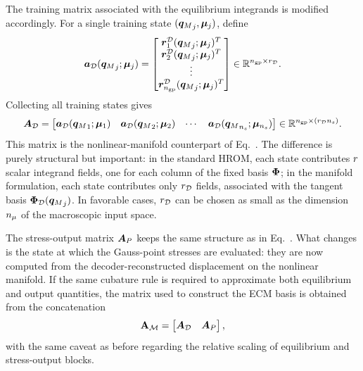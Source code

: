 \documentclass[11pt,a4paper]{article}
\begin{document}
The training matrix associated with the equilibrium integrands is modified
accordingly. For a single training state $({\bm{q}_M}_j,\bm{\mu}_j)$, define
\begin{equation}
\label{eq:aforceD_single_state}
\bm{a}_{\mathcal{D}}({\bm{q}_M}_j;\bm{\mu}_j)
=
\begin{bmatrix}
\bm{r}^{\mathcal{D}}_{1}({\bm{q}_M}_j;\bm{\mu}_j)^T\\
\bm{r}^{\mathcal{D}}_{2}({\bm{q}_M}_j;\bm{\mu}_j)^T\\
\vdots\\
\bm{r}^{\mathcal{D}}_{n_{\mathrm{gp}}}({\bm{q}_M}_j;\bm{\mu}_j)^T
\end{bmatrix}
\in \mathbb{R}^{n_{\mathrm{gp}}\times r_{\mathcal{D}}}.
\end{equation}
Collecting all training states gives
\begin{equation}
\label{eq:AforceD_training_matrix}
    \bm{A}_{\mathcal{D}}
    =
    \begin{bmatrix}
        \bm{a}_{\mathcal{D}}({\bm{q}_M}_1;\bm{\mu}_1) &
        \bm{a}_{\mathcal{D}}({\bm{q}_M}_2;\bm{\mu}_2) &
        \cdots &
        \bm{a}_{\mathcal{D}}({\bm{q}_M}_{n_s};\bm{\mu}_{n_s})
    \end{bmatrix}
    \in \mathbb{R}^{n_{\mathrm{gp}}\times(r_{\mathcal{D}}n_s)}.
\end{equation}
This matrix is the nonlinear-manifold counterpart of
Eq.~. The difference is purely structural but important:
in the standard HROM, each state contributes $r$ scalar integrand fields,
one for each column of the fixed basis $\bm{\Phi}$; in the manifold formulation,
each state contributes only $r_{\mathcal{D}}$ fields, associated with the tangent basis
$\bm{\Phi}_{\mathcal{D}}({\bm{q}_M}_j)$. In favorable cases, $r_{\mathcal{D}}$ can be chosen as small as the
dimension $n_{\mu}$ of the macroscopic input space.

The stress-output matrix $\bm{A}_{P}$ keeps the same structure as in
Eq.~. What changes is the state at which the
Gauss-point stresses are evaluated: they are now computed from the
decoder-reconstructed displacement on the nonlinear manifold. If the same
cubature rule is required to approximate both equilibrium and output
quantities, the matrix used to construct the ECM basis is obtained from the
concatenation
\begin{equation}
\label{eq:manifold_fixed_ECM_training_matrix}
  \mathbf{A}_{\mathcal{M}} =   \begin{bmatrix}
    \bm{A}_{\mathcal{D}} & \bm{A}_{P}
    \end{bmatrix},
\end{equation}
with the same caveat as before regarding the relative scaling of equilibrium
and stress-output blocks.
\end{document}
